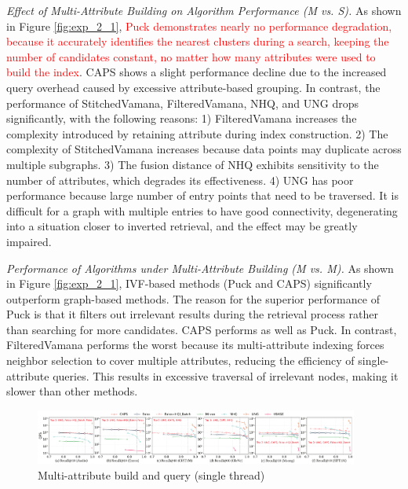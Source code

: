\documentclass[sigconf, nonacm]{acmart}
\begin{document}
	\textit{Effect of Multi-Attribute Building on Algorithm Performance (M vs. S).}
	As shown in Figure \ref{fig:exp_2_1}, \textcolor{red}{Puck demonstrates nearly no performance degradation, because it accurately identifies the nearest clusters during a search, keeping the number of candidates constant, no matter how many attributes were used to build the index}. CAPS shows a slight performance decline due to the increased query overhead caused by excessive attribute-based grouping. In contrast, the performance of StitchedVamana, FilteredVamana, NHQ, and UNG drops significantly, with the following reasons: 1) FilteredVamana increases the complexity introduced by retaining attribute during index construction. 2) The complexity of StitchedVamana increases because data points may duplicate across multiple subgraphs. 3) The fusion distance of NHQ exhibits sensitivity to the number of attributes, which degrades its effectiveness. 4) UNG has poor performance because large number of entry points that need to be traversed. It is difficult for a graph with multiple entries to have good connectivity, degenerating into a situation closer to inverted retrieval, and the effect may be greatly impaired.
	
	
	
	\textit{Performance of Algorithms under Multi-Attribute Building (M vs. M).}  
	As shown in Figure \ref{fig:exp_2_1}, IVF-based methods (Puck and CAPS) significantly outperform graph-based methods. The reason for the superior performance of Puck is that it filters out irrelevant results during the retrieval process rather than searching for more candidates. CAPS performs as well as Puck. In contrast, FilteredVamana performs the worst because its multi-attribute indexing forces neighbor selection to cover multiple attributes, reducing the efficiency of single-attribute queries. This results in excessive traversal of irrelevant nodes, making it slower than other methods.
	
	
	\begin{figure}
		\centering
		
		\includegraphics[width=0.95\textwidth]{figures/exp/exp_4_1_MultiLabel_1thread.pdf}
		\caption{Multi-attribute build and query (single thread)}
		\label{fig:exp_4_1_MultiLabel_1thread}
	\end{figure}
	
\end{document}
